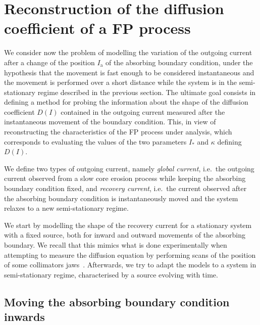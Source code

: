 
\section{Reconstruction of the diffusion coefficient of a FP process}
\label{sec:moving_the_absorbing_barrier}


We consider now the problem of modelling the variation of the outgoing current after a change of the position $I_\mathrm{a}$ of the absorbing boundary condition, under the hypothesis that the movement is fast enough to be considered instantaneous and the movement is performed over a short distance while the system is in the semi-stationary regime described in the previous section. The ultimate goal consists in defining a method for probing the information about the shape of the diffusion coefficient $D(I)$ contained in the outgoing current measured after the instantaneous movement of the boundary condition. This, in view of reconstructing the characteristics of the FP process under analysis, which corresponds to evaluating the values of the two parameters $I_\ast$ and $\kappa$ defining $D(I)$.

We define two types of outgoing current, namely \textsl{global current}, i.e.\ the outgoing current observed from a slow core erosion process while keeping the absorbing boundary condition fixed, and \textsl{recovery current}, i.e.\ the current observed after the absorbing boundary condition is instantaneously moved and the system relaxes to a new semi-stationary regime.

We start by modelling the shape of the recovery current for a stationary system with a fixed source, both for inward and outward movements of the absorbing boundary. We recall that this mimics what is done experimentally when attempting to measure the diffusion equation by performing scans of the position of some collimators jaws~{\cite{MESS1994279,flilleriii:pac03-rpag004,stancari2011diffusion,stancari:ipac11-tupz033,Stancari:1637929,PhysRevSTAB.16.021003,PhysRevAccelBeams.23.044802}}. Afterwards, we try to adapt the models to a system in semi-stationary regime, characterised by a source evolving with time.


\subsection{Moving the absorbing boundary condition inwards}

